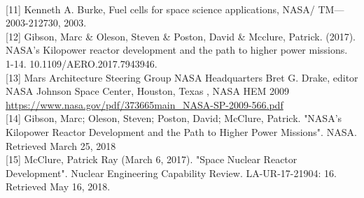 \documentclass[12pt]{IEEEtran}
\begin{document}
\begin{small}
\\
{[11]} Kenneth A. Burke, Fuel cells for space science applications, NASA/
TM—2003-212730, 2003.
\\
{[12]} Gibson, Marc \& Oleson, Steven \& Poston, David \& Mcclure, Patrick. (2017). NASA's Kilopower reactor development and the path to higher power missions. 1-14. 10.1109/AERO.2017.7943946.
\\
{[13]} Mars Architecture Steering Group
NASA Headquarters Bret G. Drake, editor
NASA Johnson Space Center, Houston, Texas , NASA HEM 2009 \url{https://www.nasa.gov/pdf/373665main_NASA-SP-2009-566.pdf}
\\
{[14]} Gibson, Marc; Oleson, Steven; Poston, David; McClure, Patrick. "NASA's Kilopower Reactor Development and the Path to Higher Power Missions". NASA. Retrieved March 25, 2018
\\
{[15]} McClure, Patrick Ray (March 6, 2017). "Space Nuclear Reactor Development". Nuclear Engineering Capability Review. LA-UR-17-21904: 16. Retrieved May 16, 2018.
\\
\end{small}

\nocite{*}


\end{document}
